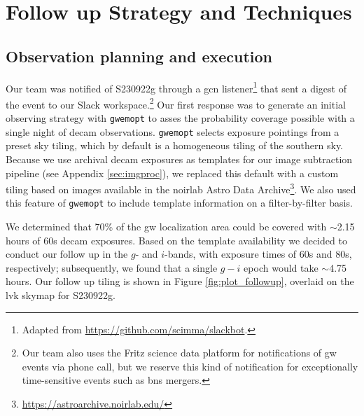 \documentclass[twocolumn]{aastex631}
\newcommand{\gweventid}{S230922g}
\newcommand{\gwemopt}{\texttt{gwemopt}}
\begin{document}
\section{Follow up Strategy and Techniques}\label{sec:techniques}

\subsection{Observation planning and execution}\label{subsec:observations}

Our team was notified of \gweventid{} through a \gls{gcn} listener\footnote{Adapted from \url{https://github.com/scimma/slackbot}.} that sent a digest of the event to our Slack workspace.\footnote{Our team also uses the Fritz science data platform \citep{coughlinDataSciencePlatform2023} for notifications of \gls{gw} events via phone call, but we reserve this kind of notification for exceptionally time-sensitive events such as \gls{bns} mergers.}
Our first response was to generate an initial observing strategy with \gwemopt{} \citep{coughlinOptimizingSearchesElectromagnetic2018} to asses the probability coverage possible with a single night of \gls{decam} observations.
\gwemopt{} selects exposure pointings from a preset sky tiling, which by default is a homogeneous tiling of the southern sky.
Because we use archival \gls{decam} exposures as templates for our image subtraction pipeline (see Appendix \ref{sec:imgproc}), we replaced this default with a custom tiling based on images available in the \gls{noirlab} Astro Data Archive\footnote{\url{https://astroarchive.noirlab.edu/}}.
We also used this feature of \gwemopt{} to include template information on a filter-by-filter basis.

We determined that 70\% of the \gls{gw} localization area could be covered with $\sim$2.15 hours of 60s \gls{decam} exposures.
Based on the template availability we decided to conduct our follow up in the $g$- and $i$-bands, with exposure times of 60s and 80s, respectively; subsequently, we found that a single $g-i$ epoch would take $\sim$4.75 hours.
Our follow up tiling is shown in Figure \ref{fig:plot_followup}, overlaid on the \gls{lvk} skymap for \gweventid{}.
\end{document}
